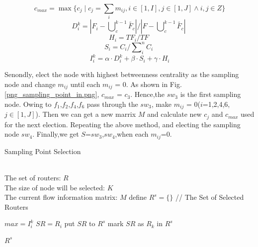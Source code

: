\documentclass[conference,compsoc]{IEEEtran}
\begin{document}
\begin{equation}
 c_{max} = \max\{ c_j \mid c_j=\sum_i{m_{ij}},i\in[1,I],j\in[1,J] \wedge  i,j\in Z\} 
\end{equation}
\begin{equation}
D_{i}^{k}={\left| {{F}_{i}}-\bigcup\nolimits_{c}^{k-1}{\widetilde{{{F}_{c}}}} \right|}/{\left| F-\bigcup\nolimits_{c}^{k-1}{\widetilde{{{F}_{c}}}} \right|}\;
\end{equation}
\begin{equation}
{{H}_{i}}={T{{F}_{i}}}/{TF}\;
\end{equation}
\begin{equation}
{{S}_{i}}={{{C}_{i}}}/{\sum\nolimits_{i}^{n}{{{C}_{i}}}}\;
\end{equation}
\begin{equation}
I_{i}^{k}=\alpha \cdot D_{i}^{k}+\beta \cdot {{S}_{i}}+\gamma \cdot {{H}_{i}}
\end{equation}

Senondly, elect the node with highest betweenness centrality as the sampling node and change $m_{ij}$ until each $m_{ij}$ = 0. As shown in Fig.\ref{png_sampling_point_in.png}, $c_{max}$ = $c_3$. Hence,the $sw_3$ is the first sampling node. Owing to $f_1$,$f_2$,$f_4$,$f_6$ pass through the $sw_3$, make $m_{ij}$ = 0($i$=1,2,4,6,$j \in [1,J]$). Then we can get a new marrix $M$ and calculate new $c_j$ and $c_{max}$ used for the next election. Repeating the above method, and electing the sampling node $sw_4$. Finally,we get $S$={$sw_3$,$sw_4$},when each $m_{ij}$=0.  

\begin{algorithm}[h]
\caption{Sampling Point Selection}
\begin{algorithmic}[1]
\REQUIRE ~~\\ The set of routers: $ R$ \\  The size of node will be selected: $K$ \\ The current flow information matrix: $M$
\STATE define $R^s=\{\}$  //  The Set of Selected Routers


\STATE $max = I_i^k$
\STATE $SR = R_i$
\ENDIF
\ENDFOR
\STATE put $SR$ to $R^s$
\STATE mark $SR$ as $R_k$ in $R^s$
\ENDFOR

\RETURN $R^s$
\label{code:recentEnd}
\end{algorithmic}
\end{algorithm}
\end{document}
